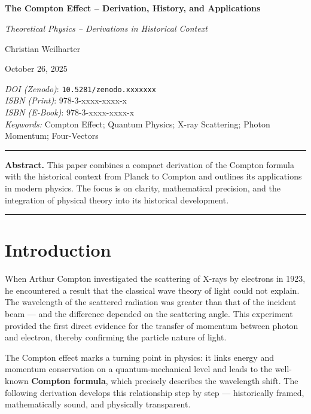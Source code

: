 \documentclass[12pt,oneside]{scrartcl}
\title{\PaperTitle\\[0.5em]\large \SeriesTitle}
\author{\PaperAuthor}
\date{\PaperDate}
\newcommand{\SeriesTitle}{Theoretical Physics – Derivations in Historical Context}
\newcommand{\PaperTitle}{The Compton Effect – Derivation, History, and Applications}
\newcommand{\PaperAuthor}{Christian Weilharter}
\newcommand{\PaperDate}{October 26, 2025}
\newcommand{\PaperDOI}{\emph{DOI (Zenodo)}: \texttt{10.5281/zenodo.xxxxxxx}}
\newcommand{\PaperISBNPDF}{\emph{ISBN (Print)}: 978-3-xxxx-xxxx-x}
\newcommand{\PaperISBNEPUB}{\emph{ISBN (E-Book)}: 978-3-xxxx-xxxx-x}
\newcommand{\PaperKeywords}{Compton Effect; Quantum Physics; X-ray Scattering; Photon Momentum; Four-Vectors}
\newcommand{\PaperMetadata}{
	\vspace{1em}
	\begin{flushleft}
		\small
		\setlength{\parskip}{3pt}
		\noindent\PaperDOI\\
		\PaperISBNPDF\\
		\PaperISBNEPUB\\
		\textit{Keywords:} \PaperKeywords
	\end{flushleft}
	\vspace{1em}
}
\begin{document}
	\thispagestyle{empty}
	\begin{center}
		{\Huge\bfseries \PaperTitle\par}
		\vspace{0.5em}
		{\Large\itshape \SeriesTitle\par}
		\vspace{2em}
		{\Large \PaperAuthor\par}
		\vspace{0.5em}
		{\large \PaperDate\par}
	\end{center}
	
	\PaperMetadata
	
	\vspace{1em}
	\hrule
	\vspace{1em}
	
	\noindent\textbf{Abstract.}  
	This paper combines a compact derivation of the Compton formula with the historical context from Planck to Compton and outlines its applications in modern physics. The focus is on clarity, mathematical precision, and the integration of physical theory into its historical development.
	
	\vspace{1em}
	\hrule
	\vspace{2em}
	
	
	
	
	\section{Introduction}
	
	When Arthur Compton investigated the scattering of X-rays by electrons in 1923, he encountered a result that the classical wave theory of light could not explain. The wavelength of the scattered radiation was greater than that of the incident beam — and the difference depended on the scattering angle. This experiment provided the first direct evidence for the transfer of momentum between photon and electron, thereby confirming the particle nature of light.
	
	The Compton effect marks a turning point in physics: it links energy and momentum conservation on a quantum-mechanical level and leads to the well-known \textbf{Compton formula}, which precisely describes the wavelength shift. The following derivation develops this relationship step by step — historically framed, mathematically sound, and physically transparent.
	
\end{document}
